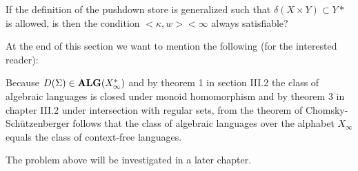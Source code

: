 If the definition of the pushdown store is generalized such that $\delta(X
\times Y) \subset Y*$ is allowed, is then the condition $<\kappa, w> <
\infty$ always satisfiable?

At the end of this section we want to mention the following (for the interested
reader):

Because $D(\Sigma) \in \mbox{{\bf ALG}}(X_\infty^*)$ and by theorem 1 in section III.2 the
class of algebraic languages is closed under monoid homomorphism and by theorem
3 in chapter III.2 under intersection with regular sets, from the theorem of
Chomsky-Schützenberger follows that the class of algebraic languages over the
alphabet $X_\infty$ equals the class of context-free languages.

The problem above will be investigated in a later chapter.
